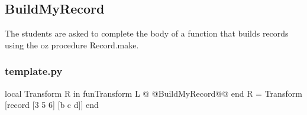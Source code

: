 \documentclass[11pt,a4paper,twoside,openright]{report}
\begin{document}

\subsection{BuildMyRecord}
The students are asked to complete the body of a function that builds records using 
the oz procedure Record.make.

\subsubsection*{template.py}

\begin{OZ}
local Transform R in 
	fun{Transform L}
@	@BuildMyRecord@@
	end
R = {Transform [record [3 5 6] [b c d]]}
end
\end{OZ}
%
%
\end{document}
